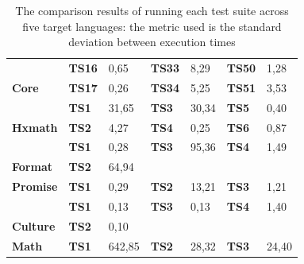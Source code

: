 \begin{table}[h]
{\begin{tabular}{|l|l|l|l|l|l|l|}
		& \textbf{TS16}      & 0,65                             & \textbf{TS33}      & 8,29                          & \textbf{TS50}      & 1,28                           \\ \cline{2-7} 
		\multirow{-17}{*}{\textbf{Core}}   & \textbf{TS17}      & 0,26                             & \textbf{TS34}      & 5,25                          & \textbf{TS51}      & 3,53                           \\ \hline
		& \textbf{TS1}       & 31,65                            & \textbf{TS3}       & 30,34                         & \textbf{TS5}       & 0,40                           \\ \cline{2-7} 
		\multirow{-2}{*}{\textbf{Hxmath}}  & \textbf{TS2}       & 4,27                             & \textbf{TS4}       & 0,25                          & \textbf{TS6}       & 0,87                           \\ \hline
		& \textbf{TS1}       & 0,28                             & \textbf{TS3}       & \cellcolor[HTML]{C0C0C0}95,36 & \textbf{TS4}       & 1,49                           \\ \cline{2-7} 
		\multirow{-2}{*}{\textbf{Format}}  & \textbf{TS2}       & \cellcolor[HTML]{C0C0C0}64,94    & \multicolumn{4}{l|}{\textbf{}}                                                                           \\ \hline
		\textbf{Promise}                   & \textbf{TS1}       & 0,29                             & \textbf{TS2}       & 13,21                         & \textbf{TS3}       & 1,21                           \\ \hline
		& \textbf{TS1}       & 0,13                             & \textbf{TS3}       & 0,13                          & \textbf{TS4}       & 1,40                           \\ \cline{2-7} 
		\multirow{-2}{*}{\textbf{Culture}} & \textbf{TS2}       & 0,10                             & \multicolumn{4}{l|}{}                                                                                    \\ \hline
		\textbf{Math}                      & \textbf{TS1}       & \cellcolor[HTML]{C0C0C0}642,85   & \textbf{TS2}       & 28,32                         & \textbf{TS3}       & 24,40                          \\ \hline
	\end{tabular}%
	}
 
		\caption{The comparison results of running each test suite across five target languages: the metric used is the standard deviation between execution times  }
 
 
 
		\label{my-label}
\end{table}


